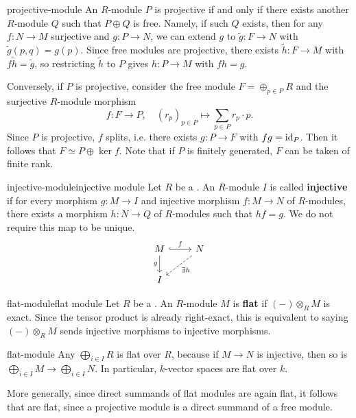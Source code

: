 \begin{example}{projective-module}
    An $R$-module $P$ is projective if and only if there exists another $R$-module $Q$ such that $P \oplus Q$ is free. Namely, if such $Q$ exists, then for any $f : N \to M$ surjective and $g : P \to N$, we can extend $g$ to $\tilde{g} : F \to N$ with $\tilde{g}(p, q) = g(p)$. Since free modules are projective, there exists $\tilde{h} : F \to M$ with $f \tilde{h} = \tilde{g}$, so restricting $\tilde{h}$ to $P$ gives $h : P \to M$ with $fh = g$.
    
    Conversely, if $P$ is projective, consider the free module $F = \oplus_{p \in P} R$ and the surjective $R$-module morphism
    \[ f : F \to P, \quad (r_p)_{p \in P} \mapsto \sum_{p \in P} r_p \cdot p . \]
    Since $P$ is projective, $f$ splits, i.e. there exists $g : P \to F$ with $fg = \text{id}_P$. Then it follows that $F \simeq P \oplus \ker f$. Note that if $P$ is finitely generated, $F$ can be taken of finite rank.
\end{example}

\begin{topic}{injective-module}{injective module}
    Let $R$ be a . An $R$-module $I$ is called \textbf{injective} if for every morphism $g : M \to I$ and injective morphism $f : M \to N$ of $R$-modules, there exists a morphism $h : N \to Q$ of $R$-modules such that $hf = g$. We do not require this map to be unique.
    \[ \begin{tikzcd} M \arrow[hookrightarrow]{r}{f} \arrow[swap]{d}{g} & N \arrow[dashed]{ld}{\exists h} \\ I & \end{tikzcd} \]
\end{topic}

\begin{topic}{flat-module}{flat module}
    Let $R$ be a . An $R$-module $M$ is \textbf{flat} if $(-) \otimes_R M$ is exact. Since the tensor product is already right-exact, this is equivalent to saying $(-) \otimes_R M$ sends injective morphisms to injective morphisms.
\end{topic}

\begin{example}{flat-module}
    Any  $\bigoplus_{i \in I} R$ is flat over $R$, because if $M \to N$ is injective, then so is $\bigoplus_{i \in I} M \to \bigoplus_{i \in I} N$.
    In particular, $k$-vector spaces are flat over $k$.
    
    More generally, since direct summands of flat modules are again flat, it follows that  are flat, since a projective module is a direct summand of a free module.
\end{example}

